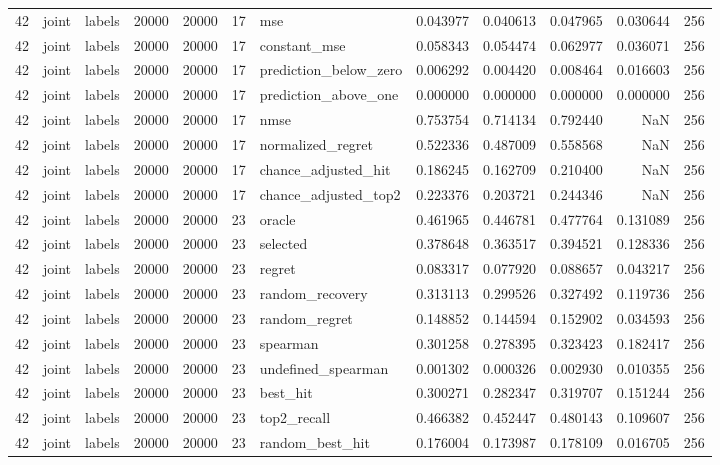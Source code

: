 \begin{tabular}{rllrrrlrrrrr}
42 & joint & labels & 20000 & 20000 & 17 & mse & 0.043977 & 0.040613 & 0.047965 & 0.030644 & 256 \\
42 & joint & labels & 20000 & 20000 & 17 & constant_mse & 0.058343 & 0.054474 & 0.062977 & 0.036071 & 256 \\
42 & joint & labels & 20000 & 20000 & 17 & prediction_below_zero & 0.006292 & 0.004420 & 0.008464 & 0.016603 & 256 \\
42 & joint & labels & 20000 & 20000 & 17 & prediction_above_one & 0.000000 & 0.000000 & 0.000000 & 0.000000 & 256 \\
42 & joint & labels & 20000 & 20000 & 17 & nmse & 0.753754 & 0.714134 & 0.792440 & NaN & 256 \\
42 & joint & labels & 20000 & 20000 & 17 & normalized_regret & 0.522336 & 0.487009 & 0.558568 & NaN & 256 \\
42 & joint & labels & 20000 & 20000 & 17 & chance_adjusted_hit & 0.186245 & 0.162709 & 0.210400 & NaN & 256 \\
42 & joint & labels & 20000 & 20000 & 17 & chance_adjusted_top2 & 0.223376 & 0.203721 & 0.244346 & NaN & 256 \\
42 & joint & labels & 20000 & 20000 & 23 & oracle & 0.461965 & 0.446781 & 0.477764 & 0.131089 & 256 \\
42 & joint & labels & 20000 & 20000 & 23 & selected & 0.378648 & 0.363517 & 0.394521 & 0.128336 & 256 \\
42 & joint & labels & 20000 & 20000 & 23 & regret & 0.083317 & 0.077920 & 0.088657 & 0.043217 & 256 \\
42 & joint & labels & 20000 & 20000 & 23 & random_recovery & 0.313113 & 0.299526 & 0.327492 & 0.119736 & 256 \\
42 & joint & labels & 20000 & 20000 & 23 & random_regret & 0.148852 & 0.144594 & 0.152902 & 0.034593 & 256 \\
42 & joint & labels & 20000 & 20000 & 23 & spearman & 0.301258 & 0.278395 & 0.323423 & 0.182417 & 256 \\
42 & joint & labels & 20000 & 20000 & 23 & undefined_spearman & 0.001302 & 0.000326 & 0.002930 & 0.010355 & 256 \\
42 & joint & labels & 20000 & 20000 & 23 & best_hit & 0.300271 & 0.282347 & 0.319707 & 0.151244 & 256 \\
42 & joint & labels & 20000 & 20000 & 23 & top2_recall & 0.466382 & 0.452447 & 0.480143 & 0.109607 & 256 \\
42 & joint & labels & 20000 & 20000 & 23 & random_best_hit & 0.176004 & 0.173987 & 0.178109 & 0.016705 & 256 \\

\end{tabular}
